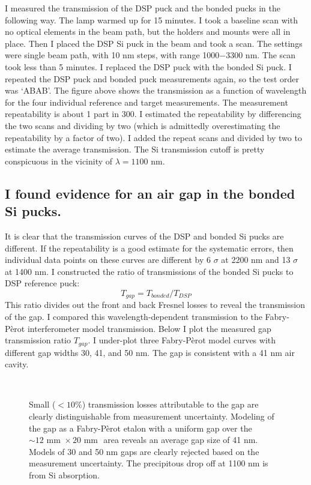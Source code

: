 I measured the transmission of the DSP puck and the bonded pucks in the following way.  The lamp warmed up for 15 minutes.  I took a baseline scan with no optical elements in the beam path, but the holders and mounts were all in place.  Then I placed the DSP Si puck in the beam and took a scan.  The settings were single beam path, with 10 nm steps, with range 1000$-$3300 nm.  The scan took less than 5 minutes.  I replaced the DSP puck with the bonded Si puck.  I repeated the DSP puck and bonded puck measurements again, so the test order was `ABAB'.  The figure above shows the transmission as a function of wavelength for the four individual reference and target measurements.  The measurement repeatability is about 1 part in 300.  I estimated the repeatability by differencing the two scans and dividing by two (which is admittedly overestimating the repeatability by a factor of two).  I added the repeat scans and divided by two to estimate the average transmission.  The Si transmission cutoff is pretty conspicuous in the vicinity of $\lambda=1100$ nm.  

\subsection{I found evidence for an air gap in the bonded Si pucks.} 

It is clear that the transmission curves of the DSP and bonded Si pucks are different.  If the repeatability is a good estimate for the systematic errors, then individual data points on these curves are different by 6 $\sigma$ at 2200 nm and 13 $\sigma$ at 1400 nm.  I constructed the ratio of transmissions of the bonded Si pucks to DSP reference puck: $$T_{gap}=T_{bonded}/T_{DSP}$$  This ratio divides out the front and back Fresnel losses to reveal the transmission of the gap.  I compared this wavelength-dependent transmission to the Fabry-P\`{e}rot interferometer model transmission.  Below I plot the measured gap transmission ratio $T_{gap}$.  I under-plot three Fabry-P\`{e}rot model curves with different gap widths 30, 41, and 50 nm.  The gap is consistent with a 41 nm air cavity.

\begin{figure}[h!] 
\begin{center}
\ 
\caption[Fabry-P\`{e}rot model of HA1$-$HA2]{Small ($<10\%$) transmission losses attributable to the gap are clearly distinguishable from measurement uncertainty.  Modeling of the gap as a Fabry-P\`{e}rot etalon with a uniform gap over the $\sim 12 \textrm{ mm } \times 20\textrm{ mm }$ area reveals an average gap size of 41 nm.  Models of 30 and 50 nm gaps are clearly rejected based on the measurement uncertainty.  The precipitous drop off at 1100 nm is from Si absorption.}
\label{fig:FabPerotHA1HA2}
\end{center}
\end{figure}


